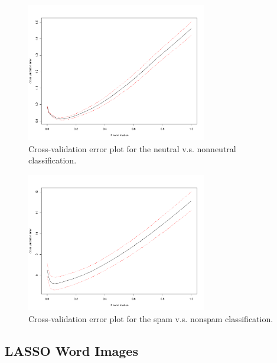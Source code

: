\documentclass[11pt]{article}
\newcommand{\1}[1]{{\mathbf 1}\left\{#1\right\}}        %
\begin{document}
\begin{center}
\begin{figure}[!h]
   \centering
   \includegraphics[width=0.7\textwidth]{../lassoResults/CVNeuErr.pdf} 
      \caption{Cross-validation error plot for the neutral v.s. nonneutral classification. }
   \label{fig:cvplotneu}
\end{figure}
\end{center}

\begin{center}
\begin{figure}[!h]
   \centering
   \includegraphics[width=0.7\textwidth]{../lassoResults/CVSpamErr.pdf} 
      \caption{Cross-validation error plot for the spam v.s. nonspam classification. }
   \label{fig:cvplotspam}
\end{figure}
\end{center}

\newpage
\newpage
\subsection{LASSO Word Images}\label{asec:lassowordimages}
\end{document}
